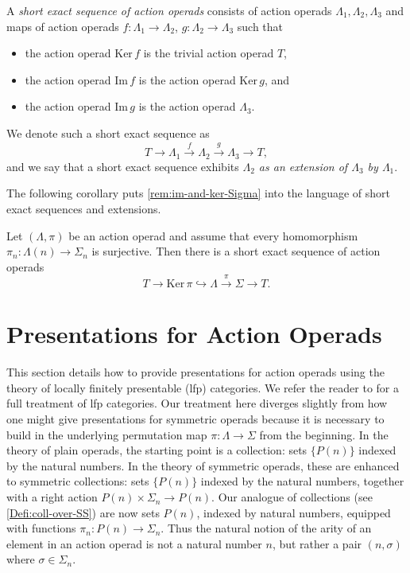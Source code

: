 \begin{Defi}\label{Defi:ses-aop}
A \emph{short exact sequence of action operads} consists of action operads $\Lambda_1, \Lambda_2, \Lambda_3$ and maps of action operads $f \colon \Lambda_1 \to \Lambda_2$, $g \colon \Lambda_2 \to \Lambda_3$ such that
\begin{itemize}
\item the action operad $\mathrm{Ker}\,f$ is the trivial action operad $T$,
\item the action operad $\mathrm{Im}\,f$ is the action operad $\mathrm{Ker}\,g$, and
\item the action operad $\mathrm{Im}\,g$ is the action operad $\Lambda_3$.
\end{itemize}
We denote such a short exact sequence as
\[
T \to \Lambda_1 \stackrel{f}{\to} \Lambda_2 \stackrel{g}{\to} \Lambda_3 \to T,
\]
and we say that a short exact sequence exhibits \emph{$\Lambda_2$ as an extension of $\Lambda_3$ by $\Lambda_1$}.
\end{Defi}

The following corollary puts \cref{rem:im-and-ker-Sigma} into the language of short exact sequences and extensions.

\begin{cor}\label{cor:extension}
Let $(\Lambda, \pi)$ be an action operad and assume that every homomorphism $\pi_n \colon \Lambda(n) \to \Sigma_n$ is surjective.
Then there is a short exact sequence of action operads
  \[
    T \rightarrow \mathrm{Ker}\,\pi \hookrightarrow \Lambda \stackrel{\pi}{\longrightarrow} \Sigma \rightarrow T.
  \]
\end{cor}

\section{Presentations for Action Operads}

This section details how to provide presentations for action operads using the theory of locally finitely presentable (lfp) categories.
We refer the reader to \cite{ar} for a full treatment of lfp categories.
Our treatment here diverges slightly from how one might give presentations for symmetric operads because it is necessary to build in the underlying permutation map $\pi \colon \Lambda \to \Sigma$ from the beginning.
In the theory of plain operads, the starting point is a collection: sets $\{ P(n) \}$ indexed by the natural numbers.
In the theory of symmetric operads, these are enhanced to symmetric collections: sets $\{ P(n) \}$ indexed by the natural numbers, together with a right action $P(n) \times \Sigma_n \to P(n)$.
Our analogue of collections (see \cref{Defi:coll-over-SS}) are now sets $P(n)$, indexed by natural numbers, equipped with functions $\pi_n \colon P(n) \to \Sigma_n$.
Thus the natural notion of the arity of an element in an action operad is not a natural number $n$, but rather a pair $(n, \sigma)$ where $\sigma \in \Sigma_n$.

